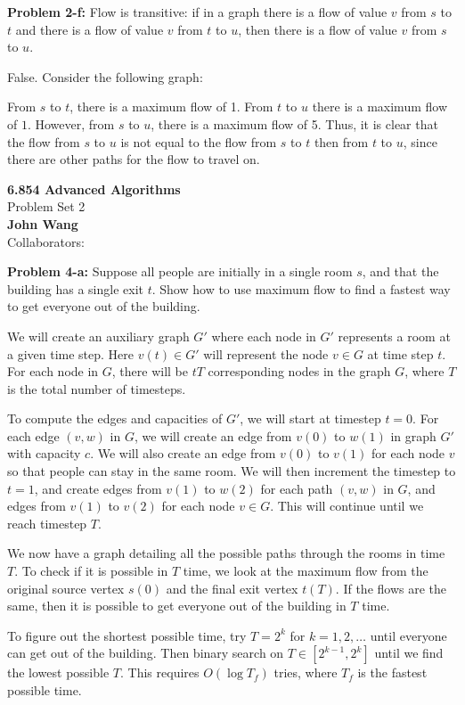 \documentclass[psamsfonts]{amsart}
\newenvironment{sol}{\vspace{0.25cm}{\large \bfseries Solution:}}{\qedsymbol}
\newenvironment{prob}[1]{\begin{framed}{\large \bfseries Problem #1:}}{\end{framed}}
\newcommand{\makenewtitle}{
    \begin{center}
    {\huge \bfseries 6.854 Advanced Algorithms} \\
    Problem Set 2\\
    \vspace{0.25cm}
    {\bfseries John Wang} \\
    Collaborators:
    \end{center}
    \vspace{0.5cm}
}
\begin{document}
\begin{prob}{2-f}
Flow is transitive: if in a graph there is a flow of value $v$ from $s$ to $t$ and there is a flow of value $v$ from $t$ to $u$, then there is a flow of value $v$ from $s$ to $u$.
\end{prob}
\begin{sol}
False. Consider the following graph:
\begin{figure}[h!]
\centering
{}
\end{figure}

From $s$ to $t$, there is a maximum flow of 1. From $t$ to $u$ there is a maximum flow of $1$. However, from $s$ to $u$, there is a maximum flow of 5. Thus, it is clear that the flow from $s$ to $u$ is not equal to the flow from $s$ to $t$ then from $t$ to $u$, since there are other paths for the flow to travel on. 
\end{sol}

\newpage
\makenewtitle

\begin{prob}{4-a}
Suppose all people are initially in a single room $s$, and that the building has a single exit $t$. Show how to use maximum flow to find a fastest way to get everyone out of the building.
\end{prob}
\begin{sol}
We will create an auxiliary graph $G'$ where each node in $G'$ represents a room at a given time step. Here $v(t) \in G'$ will represent the node $v \in G$ at time step $t$. For each node in $G$, there will be $tT$ corresponding nodes in the graph $G$, where $T$ is the total number of timesteps.

To compute the edges and capacities of $G'$, we will start at timestep $t=0$. For each edge $(v,w)$ in $G$, we will create an edge from $v(0)$ to $w(1)$ in graph $G'$ with capacity $c$. We will also create an edge from $v(0)$ to $v(1)$ for each node $v$ so that people can stay in the same room. We will then increment the timestep to $t=1$, and create edges from $v(1)$ to $w(2)$ for each path $(v,w)$ in $G$, and edges from $v(1)$ to $v(2)$ for each node $v \in G$. This will continue until we reach timestep $T$. 

We now have a graph detailing all the possible paths through the rooms in time $T$. To check if it is possible in $T$ time, we look at the maximum flow from the original source vertex $s(0)$ and the final exit vertex $t(T)$. If the flows are the same, then it is possible to get everyone out of the building in $T$ time. 

To figure out the shortest possible time, try $T=2^{k}$ for $k=1,2,\ldots$ until everyone can get out of the building. Then binary search on $T \in [2^{k-1}, 2^{k}]$ until we find the lowest possible $T$. This requires $O(\log T_{f})$ tries, where $T_f$ is the fastest possible time.
\end{sol}
\end{document}
